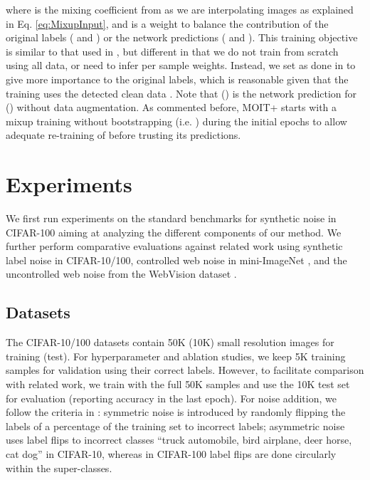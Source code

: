 \documentclass[final]{cvpr}
\begin{document}
where  is the mixing coefficient from \cite{2018_ICLR_mixup} as we are interpolating images as explained in Eq. \ref{eq:MixupInput}, and  is a weight to balance the contribution of the original labels ( and ) or the network predictions ( and ). This training objective is similar to that used in \cite{2019_ICML_DynamicBootstrapping}, but different in that we do not train from scratch using all data, or need to infer per sample  weights. Instead, we set  as done in \cite{2015_ICLR_Bootstrapping} to give more importance to the original labels, which is reasonable given that the training uses the detected clean data . Note that  () is the network prediction for  () without data augmentation. As commented before, MOIT+ starts with a mixup training without bootstrapping (i.e. ) during the initial epochs to allow adequate re-training of  before trusting its predictions.


\section{Experiments}

We first run experiments on the standard benchmarks for synthetic noise in CIFAR-100 \cite{2009_CIFAR} aiming at analyzing the different components of our method. We further perform comparative evaluations against related work using synthetic label noise in CIFAR-10/100, controlled web noise in mini-ImageNet \cite{2020_ICML_DatasetOOD}, and the uncontrolled web noise from the WebVision dataset \cite{2017_arXiv_WebVision}. 

\subsection{Datasets}

The CIFAR-10/100 datasets \cite{2009_CIFAR} contain 50K (10K) small resolution images for training (test). For hyperparameter and ablation studies, we keep 5K training samples for validation using their correct labels. However, to facilitate comparison with related work, we train with the full 50K samples and use the 10K test set for evaluation (reporting accuracy in the last epoch). For noise addition, we follow the criteria in \cite{2019_CVPR_JointOptimizImproved}: symmetric noise is introduced by randomly flipping the labels of a percentage of the training set to incorrect labels; asymmetric noise uses label flips to incorrect classes ``truck  automobile, bird  airplane, deer  horse, cat  dog'' in CIFAR-10, whereas in CIFAR-100 label flips are done circularly within the super-classes.
\end{document}
